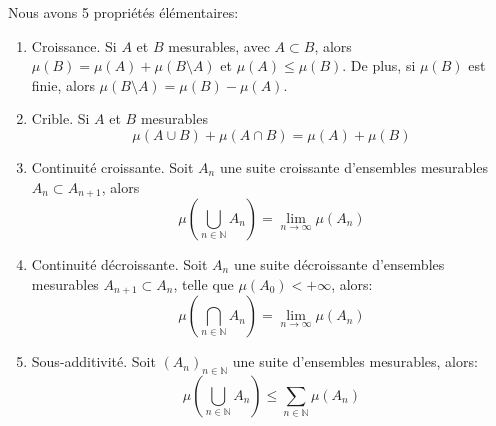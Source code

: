\begin{prop}\label{prop:mesure:elementaire}
	Nous avons 5 propriétés élémentaires:
	\begin{enumerate}
		\item Croissance. Si $A$ et $B$ mesurables, avec $A \subset B$, alors $\mu(B) = \mu(A) + \mu(B \setminus A)$ et $\mu(A) \leq \mu(B)$. De plus,
		      si $\mu(B)$ est finie, alors $\mu(B\setminus A) = \mu(B) - \mu(A)$.
		\item Crible. Si $A$ et $B$ mesurables
		      \[\mu(A\cup B) + \mu(A \cap B) = \mu(A) + \mu(B)\]
		\item Continuité croissante. Soit $A_n$ une suite croissante d'ensembles mesurables $A_n \subset A_{n+1}$,
		      alors
		      \[\mu(\bigcup\limits_{n \in \mathbb{N}} A_n) = \lim\limits_{n \to \infty} \mu(A_n)\]
		\item Continuité décroissante. Soit $A_n$ une suite décroissante d'ensembles mesurables $A_{n+1}
			      \subset A_n$, telle que $\mu(A_0) < +\infty$, alors:
		      \[\mu(\bigcap\limits_{n \in \mathbb{N}} A_n) = \lim\limits_{n \to \infty} \mu(A_n)\]
		\item Sous-additivité. Soit $(A_n)_{n \in \mathbb{N}}$ une suite d'ensembles mesurables, alors:
		      \[\mu(\bigcup\limits_{n \in \mathbb{N}} A_n) \leq \sum\limits_{n \in \mathbb{N}} \mu(A_n)\]
	\end{enumerate}
\end{prop}

